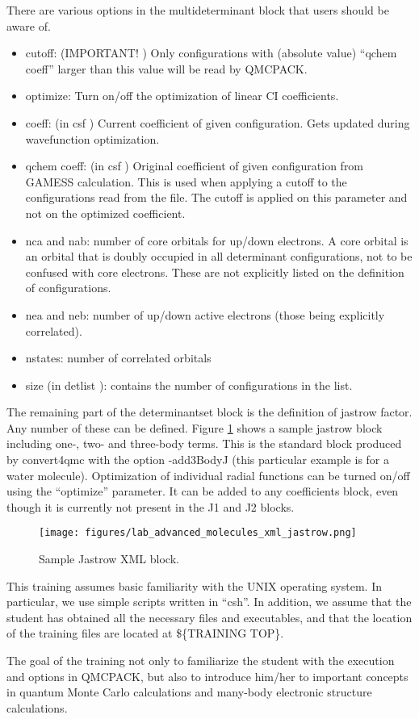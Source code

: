 There are various options in the multideterminant block that users should be aware of.
\begin{itemize}
  \item{cutoff: (IMPORTANT! ) Only configurations with (absolute value) “qchem coeff”
larger than this value will be read by QMCPACK.}
  \item{optimize: Turn on/off the optimization of linear CI coefficients.}
  \item{coeff: (in csf ) Current coefficient of given configuration. Gets updated during 
wavefunction optimization.}
  \item{qchem coeff: (in csf ) Original coefficient of given configuration from GAMESS 
calculation. This is used when applying a cutoff to the configurations read from the file.
The cutoff is applied on this parameter and not on the optimized coefficient.}
  \item{nca and nab: number of core orbitals for up/down electrons. A core orbital is an
orbital that is doubly occupied in all determinant configurations, not to be confused
with core electrons. These are not explicitly listed on the definition of configurations.}
  \item{nea and neb: number of up/down active electrons (those being explicitly correlated).}
  \item{nstates: number of correlated orbitals}
  \item{size (in detlist ): contains the number of configurations in the list.}
\end{itemize}
The remaining part of the determinantset block is the definition of jastrow factor. Any
number of these can be defined. Figure \ref{fig:lam_xml_jastrow} shows a sample jastrow 
block including one-, two- and three-body terms. This is the standard block produced by 
convert4qmc with the option -add3BodyJ (this particular example is for a water molecule). 
Optimization of individual radial functions can be turned on/off using the “optimize” 
parameter. It can be added to any coefficients block, even though it is currently not 
present in the J1 and J2 blocks.

\begin{figure}[ht!]
\begin{center}
\texttt{[image: figures/lab\_advanced\_molecules\_xml\_jastrow.png]}
\end{center}
\caption{Sample Jastrow XML block.
\label{fig:lam_xml_jastrow}
}
\end{figure}

This training assumes basic familiarity with the UNIX operating system. In particular,
we use simple scripts written in “csh”. In addition, we assume that the student has obtained
all the necessary files and executables, and that the location of the training files are located
at \$\{TRAINING TOP\}.

The goal of the training not only to familiarize the student with the execution and
options in QMCPACK, but also to introduce him/her to important concepts in quantum
Monte Carlo calculations and many-body electronic structure calculations.



